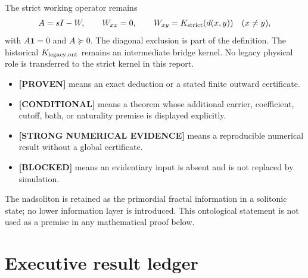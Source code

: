 \documentclass[11pt,a4paper]{article}
\newcommand{\Proven}{\textcolor{proved}{\textbf{[PROVEN]}}}
\newcommand{\Evidence}{\textcolor{conditional}{\textbf{[STRONG NUMERICAL EVIDENCE]}}}
\newcommand{\Conditional}{\textcolor{conditional}{\textbf{[CONDITIONAL]}}}
\newcommand{\Blocked}{\textcolor{blocked}{\textbf{[BLOCKED]}}}
\begin{document}
The strict working operator remains
\[
A=sI-W,\qquad W_{xx}=0,\qquad
W_{xy}=K_{\rm strict}(d(x,y))\quad(x\ne y),
\]
with $A\bm 1=0$ and $A\succeq0$. The diagonal exclusion is part of the definition. The
historical $K_{\rm legacy,ont}$ remains an intermediate bridge kernel. No legacy physical
role is transferred to the strict kernel in this report.

\begin{itemize}
\item \Proven{} means an exact deduction or a stated finite outward certificate.
\item \Conditional{} means a theorem whose additional carrier, coefficient, cutoff, bath,
or naturality premise is displayed explicitly.
\item \Evidence{} means a reproducible numerical result without a global certificate.
\item \Blocked{} means an evidentiary input is absent and is not replaced by simulation.
\end{itemize}

The nadsoliton is retained as the primordial fractal information in a solitonic state; no
lower information layer is introduced. This ontological statement is not used as a premise
in any mathematical proof below.

\section{Executive result ledger}
\end{document}
